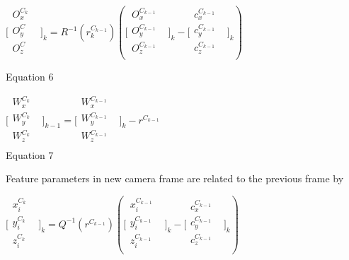 \begin{center}$\lbrack \begin{matrix}
O_{x}^{C_{k}} & \\
O_{y}^{C} & \\
O_{z}^{C} & \\
\end{matrix}
\rbrack _{k}=R^{-1}(r_{k}^{C_{k-1}})(\lbrack \begin{matrix}
O_{x}^{C_{k-1}} & \\
O_{y}^{C_{k-1}} & \\
O_{z}^{C_{k-1}} & \\
\end{matrix}
\rbrack _{k}- \lbrack \begin{matrix}
c_{x}^{C_{k-1}} & \\
c_{y}^{C_{k-1}} & \\
c_{z}^{C_{k-1}} & \\
\end{matrix}
\rbrack _{k})$\\
\end{center}

Equation 6

$\lbrack \begin{matrix}
 W_{x}^{C_{k}} & \\
W_{y}^{C_{k}} & \\
W_{z}^{C_{k}} & \\
\end{matrix}
\rbrack _{k-1}= \lbrack \begin{matrix}
 W_{x}^{C_{k-1}} & \\
W_{y}^{C_{k-1}} & \\
W_{z}^{C_{k-1}} & \\
\end{matrix}
\rbrack _{k}-r^{C_{k-1}}$\\


Equation 7

Feature parameters in new camera frame are related to the previous frame 
by

$\lbrack \begin{matrix}
x_{i}^{C_{k}} & \\
y_{i}^{C_{k}} & \\
z_{i}^{C_{k}} & \\
\end{matrix}
\rbrack _{k}=Q^{-1}(r^{C_{k-1}})(\lbrack \begin{matrix}
x_{i}^{C_{k-1}} & \\
y_{i}^{C_{k-1}} & \\
z_{i}^{C_{k-1}} & \\
\end{matrix}
\rbrack _{k}- \lbrack \begin{matrix}
c_{x}^{C_{k-1}} & \\
c_{y}^{C_{k-1}} & \\
c_{z}^{C_{k-1}} & \\
\end{matrix}
\rbrack _{k})$\\


